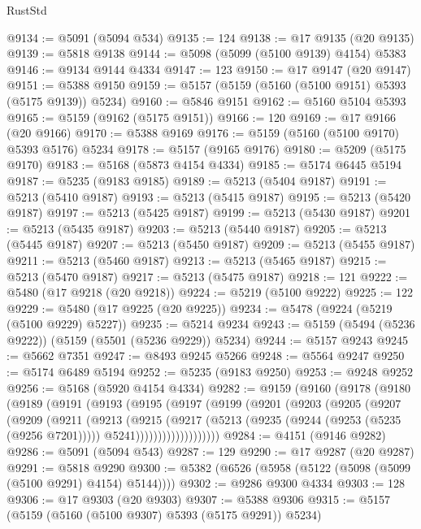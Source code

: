 \begin{lexlean}{RustStd}
\begin{coremodule}
@9134 := @5091 (@5094 @534)
@9135 := 124
@9138 := @17 @9135 (@20 @9135)
@9139 := @5818 @9138
@9144 := @5098 (@5099 (@5100 @9139) @4154) @5383
@9146 := @9134 @9144 @4334
@9147 := 123
@9150 := @17 @9147 (@20 @9147)
@9151 := @5388 @9150
@9159 := @5157 (@5159 (@5160 (@5100 @9151) @5393 (@5175 @9139)) @5234)
@9160 := @5846 @9151
@9162 := @5160 @5104 @5393
@9165 := @5159 (@9162 (@5175 @9151))
@9166 := 120
@9169 := @17 @9166 (@20 @9166)
@9170 := @5388 @9169
@9176 := @5159 (@5160 (@5100 @9170) @5393 @5176) @5234
@9178 := @5157 (@9165 @9176)
@9180 := @5209 (@5175 @9170)
@9183 := @5168 (@5873 @4154 @4334)
@9185 := @5174 @6445 @5194
@9187 := @5235 (@9183 @9185)
@9189 := @5213 (@5404 @9187)
@9191 := @5213 (@5410 @9187)
@9193 := @5213 (@5415 @9187)
@9195 := @5213 (@5420 @9187)
@9197 := @5213 (@5425 @9187)
@9199 := @5213 (@5430 @9187)
@9201 := @5213 (@5435 @9187)
@9203 := @5213 (@5440 @9187)
@9205 := @5213 (@5445 @9187)
@9207 := @5213 (@5450 @9187)
@9209 := @5213 (@5455 @9187)
@9211 := @5213 (@5460 @9187)
@9213 := @5213 (@5465 @9187)
@9215 := @5213 (@5470 @9187)
@9217 := @5213 (@5475 @9187)
@9218 := 121
@9222 := @5480 (@17 @9218 (@20 @9218))
@9224 := @5219 (@5100 @9222)
@9225 := 122
@9229 := @5480 (@17 @9225 (@20 @9225))
@9234 := @5478 (@9224 (@5219 (@5100 @9229) @5227))
@9235 := @5214 @9234
@9243 := @5159 (@5494 (@5236 @9222)) (@5159 (@5501 (@5236 @9229)) @5234)
@9244 := @5157 @9243
@9245 := @5662 @7351
@9247 := @8493 @9245 @5266
@9248 := @5564 @9247
@9250 := @5174 @6489 @5194
@9252 := @5235 (@9183 @9250)
@9253 := @9248 @9252
@9256 := @5168 (@5920 @4154 @4334)
@9282 := @9159
    (@9160
      (@9178
        (@9180
          (@9189
            (@9191
              (@9193
                (@9195
                  (@9197
                    (@9199
                      (@9201
                        (@9203
                          (@9205
                            (@9207
                              (@9209
                                (@9211
                                  (@9213
                                    (@9215
                                      (@9217
                                        (@5213
                                          (@9235 (@9244 (@9253 (@5235 (@9256 @7201)))))
                                          @5241)))))))))))))))))))
@9284 := @4151 (@9146 @9282)
@9286 := @5091 (@5094 @543)
@9287 := 129
@9290 := @17 @9287 (@20 @9287)
@9291 := @5818 @9290
@9300 := @5382 (@6526 (@5958 (@5122 (@5098 (@5099 (@5100 @9291) @4154) @5144))))
@9302 := @9286 @9300 @4334
@9303 := 128
@9306 := @17 @9303 (@20 @9303)
@9307 := @5388 @9306
@9315 := @5157 (@5159 (@5160 (@5100 @9307) @5393 (@5175 @9291)) @5234)

\end{coremodule}
\end{lexlean}
